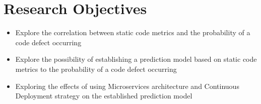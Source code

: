 \chapter{Research Objectives}
\begin{itemize}
\item Explore the correlation between static code metrics and the probability of a code defect occurring
\item Explore the possibility of establishing a prediction model based on static code metrics to the probability of a code defect occurring 
\item Exploring the effects of using Microservices architecture and Continuous Deployment strategy on the established prediction model
\end{itemize}